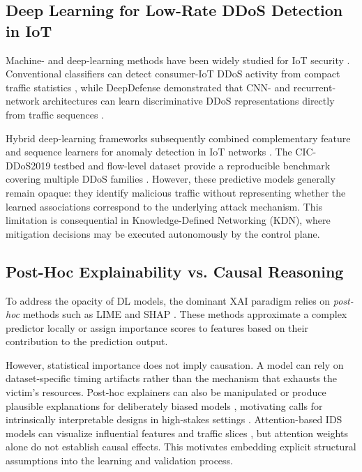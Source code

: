 \documentclass[journal]{IEEEtran}
\begin{document}
\subsection{Deep Learning for Low-Rate DDoS Detection in IoT}

Machine- and deep-learning methods have been widely studied for IoT security \cite{algaradi2020iotsecurity}. Conventional classifiers can detect consumer-IoT DDoS activity from compact traffic statistics \cite{doshi2018ml_iot_ddos}, while DeepDefense demonstrated that CNN- and recurrent-network architectures can learn discriminative DDoS representations directly from traffic sequences \cite{yuan2017deepdefense}.

Hybrid deep-learning frameworks subsequently combined complementary feature and sequence learners for anomaly detection in IoT networks \cite{ullah2021hybrid}. The CIC-DDoS2019 testbed and flow-level dataset provide a reproducible benchmark covering multiple DDoS families \cite{sharafaldin2019cicddos}. However, these predictive models generally remain opaque: they identify malicious traffic without representing whether the learned associations correspond to the underlying attack mechanism. This limitation is consequential in Knowledge-Defined Networking (KDN), where mitigation decisions may be executed autonomously by the control plane.

\subsection{Post-Hoc Explainability vs. Causal Reasoning}

To address the opacity of DL models, the dominant XAI paradigm relies on \textit{post-hoc} methods such as LIME and SHAP \cite{ribeiro2016lime,lundberg2017shap}. These methods approximate a complex predictor locally or assign importance scores to features based on their contribution to the prediction output.

However, statistical importance does not imply causation. A model can rely on dataset-specific timing artifacts rather than the mechanism that exhausts the victim's resources. Post-hoc explainers can also be manipulated or produce plausible explanations for deliberately biased models \cite{slack2020fooling}, motivating calls for intrinsically interpretable designs in high-stakes settings \cite{rudin2019stop}. Attention-based IDS models can visualize influential features and traffic slices \cite{liu2020hierarchical}, but attention weights alone do not establish causal effects. This motivates embedding explicit structural assumptions into the learning and validation process.
\end{document}
